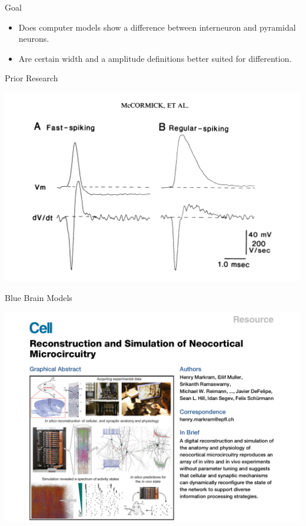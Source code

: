 \documentclass[aspectratio=169]{beamer}
\begin{document}
\begin{frame}{Goal}
    \begin{itemize}
        \item Does computer models show a difference between interneuron
            and pyramidal neurons.
        \item Are certain width and a amplitude definitions better suited for 
            differention.
    \end{itemize}
\end{frame}

\begin{frame}{Prior Research}
    \begin{center}
        \includegraphics[width=.8\textwidth]{images/mc_cormick_fs_rs.png}
    \end{center}
\end{frame}

\begin{frame}{Blue Brain Models}
    \begin{center}
        \includegraphics[width=.6\textwidth]{images/markram_front.png}
    \end{center}
\end{frame}
\end{document}
